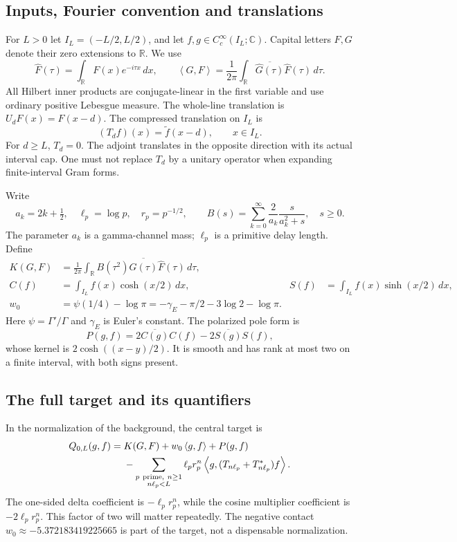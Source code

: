 \documentclass[11pt]{article}
\numberwithin{equation}{section}
\theoremstyle{definition}
\theoremstyle{remark}
\newcommand{\R}{\mathbb R}
\newcommand{\C}{\mathbb C}
\newcommand{\ip}[2]{\left\langle#1,#2\right\rangle}
\begin{document}
\subsection{Inputs, Fourier convention and translations}
For $L>0$ let $I_L=(-L/2,L/2)$, and let $f,g\in C_c^\infty(I_L;\C)$. Capital letters $F,G$ denote their zero extensions to $\R$. We use
\begin{equation}
\widehat F(\tau)=\int_\R F(x)e^{-i\tau x}\,dx,
\qquad
\ip{G}{F}=\frac1{2\pi}\int_\R
\overline{\widehat G(\tau)}\widehat F(\tau)\,d\tau.
\end{equation}
All Hilbert inner products are conjugate-linear in the first variable and use ordinary positive Lebesgue measure. The whole-line translation is $U_dF(x)=F(x-d)$. The compressed translation on $I_L$ is
\begin{equation}
(T_df)(x)=\widetilde f(x-d),\qquad x\in I_L.
\end{equation}
For $d\ge L$, $T_d=0$. The adjoint translates in the opposite direction with its actual interval cap. One must not replace $T_d$ by a unitary operator when expanding finite-interval Gram forms.

Write
\begin{equation}
 a_k=2k+\tfrac12,\quad \ell_p=\log p,\quad r_p=p^{-1/2},
 \qquad B(s)=\sum_{k=0}^\infty\frac2{a_k}\frac{s}{a_k^2+s},\quad s\ge0.
 \label{eq:B}
\end{equation}
The parameter $a_k$ is a gamma-channel mass; $\ell_p$ is a primitive delay length. Define
\begin{align}
 K(G,F)&=\frac1{2\pi}\int_\R B(\tau^2)
          \overline{\widehat G(\tau)}\widehat F(\tau)\,d\tau,\label{eq:K}\\
 C(f)&=\int_{I_L}f(x)\cosh(x/2)\,dx,
 &S(f)&=\int_{I_L}f(x)\sinh(x/2)\,dx,\label{eq:poles}\\
 w_0&=\psi(1/4)-\log\pi
 =-\gamma_E-\pi/2-3\log2-\log\pi.
\end{align}
Here $\psi=\Gamma'/\Gamma$ and $\gamma_E$ is Euler's constant. The polarized pole form is
\begin{equation}
 P(g,f)=2\overline{C(g)}C(f)-2\overline{S(g)}S(f),
 \label{eq:P}
\end{equation}
whose kernel is $2\cosh((x-y)/2)$. It is smooth and has rank at most two on a finite interval, with both signs present.

\subsection{The full target and its quantifiers}
In the normalization of the background, the central target is
\begin{align}
 Q_{0,L}(g,f)={}&K(G,F)+w_0\ip{g}{f}+P(g,f)\notag\\
 &-\sum_{\substack{p\ \mathrm{prime},\ n\ge1\\n\ell_p<L}}
 \ell_pr_p^n\ip{g}{(T_{n\ell_p}+T_{n\ell_p}^*)f}.
 \label{eq:target}
\end{align}
The one-sided delta coefficient is $-\ell_pr_p^n$, while the cosine multiplier coefficient is $-2\ell_pr_p^n$. This factor of two will matter repeatedly. The negative contact $w_0\approx-5.372183419225665$ is part of the target, not a dispensable normalization.
\end{document}
